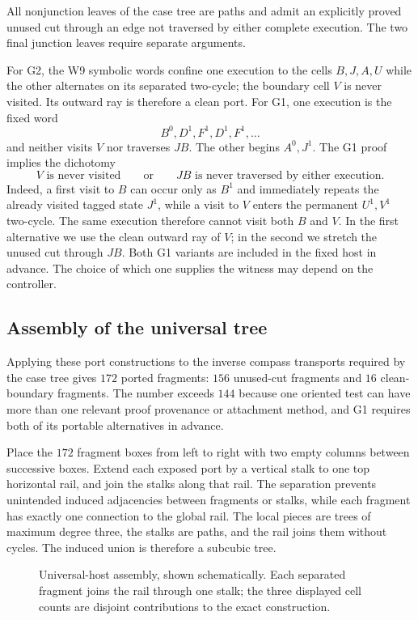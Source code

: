 All nonjunction leaves of the case tree are paths and admit an explicitly proved
unused cut through an edge not traversed by either complete execution.  The two final
junction leaves require separate arguments.

For G2, the W9 symbolic words confine one execution to the cells $B,J,A,U$ while the
other alternates on its separated two-cycle; the boundary cell $V$ is never visited.
Its outward ray is therefore a clean port.  For G1, one execution is the fixed word
\[
 B^0,D^1,F^1,D^1,F^1,\ldots
\]
and neither visits $V$ nor traverses $JB$.  The other begins $A^0,J^1$.  The G1 proof
implies the dichotomy
\[
  V\text{ is never visited}
  \qquad\text{or}\qquad
  JB\text{ is never traversed by either execution}.
\]
Indeed, a first visit to $B$ can occur only as $B^1$ and immediately repeats the
already visited tagged state $J^1$, while a visit to $V$ enters the permanent
$U^1,V^1$ two-cycle.  The same execution therefore cannot visit both $B$ and $V$.
In the first alternative we use the clean outward ray of $V$; in the second we stretch
the unused cut through $JB$.  Both G1 variants are included in the fixed host in
advance.  The choice of which one supplies the witness may depend on the controller.

\subsection{Assembly of the universal tree}
\label{subsubsec:universal-tree-assembly}

Applying these port constructions to the inverse compass transports required by the
case tree gives $172$ ported fragments: $156$ unused-cut fragments and $16$
clean-boundary fragments.  The number exceeds $144$ because one oriented test can
have more than one relevant proof provenance or attachment method, and G1 requires
both of its portable alternatives in advance.

Place the $172$ fragment boxes from left to right with two empty columns between
successive boxes.  Extend each exposed port by a vertical stalk to one top horizontal
rail, and join the stalks along that rail.  The separation prevents unintended induced
adjacencies between fragments or stalks, while each fragment has exactly one connection
to the global rail.  The local pieces are trees of maximum degree three, the stalks are
paths, and the rail joins them without cycles.  The induced union is therefore a
subcubic tree.

\begin{figure}[t]
\centering

\caption{Universal-host assembly, shown schematically. Each separated fragment joins the
rail through one stalk; the three displayed cell counts are disjoint contributions
to the exact construction.}
\label{fig:global-rail}
\end{figure}


